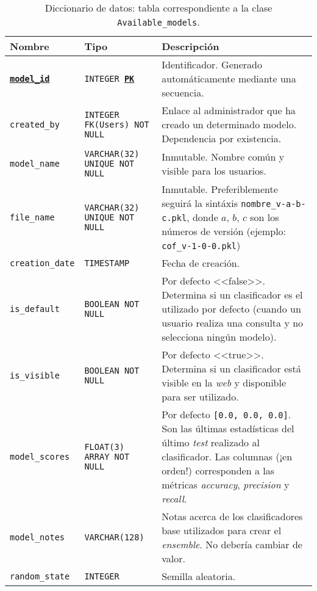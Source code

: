 \begin{table}
	\small
	\begin{centering}
		\begin{tabular}{@{}p{7em} p{6em} p{20em}@{}}
			\toprule
			\textbf{Nombre} & \textbf{Tipo} & \textbf{Descripción}\\
			\midrule
			\texttt{\textbf{\underline{model\_id}}} & \texttt{INTEGER \textbf{\underline{PK}}} & Identificador. Generado automáticamente mediante una secuencia. \\
			\texttt{created\_by} & \texttt{INTEGER FK(Users) NOT NULL} &  Enlace al administrador que ha creado un determinado modelo. Dependencia por existencia.\\
			\texttt{model\_name} & \texttt{VARCHAR(32) UNIQUE NOT NULL} & Inmutable. Nombre común y visible para los usuarios. \\
			\texttt{file\_name} & \texttt{VARCHAR(32) UNIQUE NOT NULL} & Inmutable. Preferiblemente seguirá la sintáxis \texttt{nombre\_v-a-b-c.pkl}, donde $a$, $b$, $c$ son los números de versión (ejemplo: \texttt{cof\_v-1-0-0.pkl})    \\
			\texttt{creation\_date} & \texttt{TIMESTAMP} &  Fecha de creación.   \\
			\texttt{is\_default} & \texttt{BOOLEAN NOT NULL} & Por defecto <<false>>. Determina si un clasificador es el utilizado por defecto (cuando un usuario realiza una consulta y no selecciona ningún modelo).   \\
			\texttt{is\_visible} & \texttt{BOOLEAN NOT NULL} & Por defecto <<true>>. Determina si un clasificador está visible en la \textit{web} y disponible para ser utilizado.\\
			\texttt{model\_scores} & \texttt{FLOAT(3) ARRAY NOT NULL} & Por defecto \texttt{[0.0, 0.0, 0.0]}. Son las últimas estadísticas del último \textit{test} realizado al clasificador. Las columnas (¡en orden!) corresponden a las métricas \textit{accuracy}, \textit{precision} y \textit{recall}. \\			
			\texttt{model\_notes} & \texttt{VARCHAR(128)} & Notas acerca de los clasificadores base utilizados para crear el \textit{ensemble}. No debería cambiar de valor.\\
			\texttt{random\_state} & \texttt{INTEGER} &  Semilla aleatoria.  \\
			\bottomrule
		\end{tabular}
	\end{centering}
	\caption[Diccionario de datos: Available\_models]{Diccionario de datos: tabla correspondiente a la clase \texttt{Available\_models}.}
	\label{datadic:models}
\end{table}

